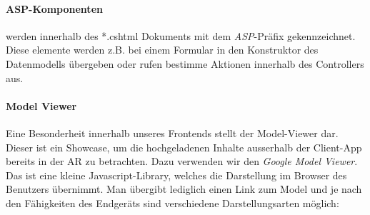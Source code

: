 \documentclass[titlepage, a4paper, 11pt]{scrartcl}
\begin{document}
        \paragraph{ASP-Komponenten} werden innerhalb des *.cshtml Dokuments mit dem \textit{ASP}-Präfix gekennzeichnet. Diese elemente werden z.B. bei einem Formular in den Konstruktor
        des Datenmodells übergeben oder rufen bestimme Aktionen innerhalb des Controllers aus.
        
        \paragraph{Model Viewer}

          Eine Besonderheit innerhalb unseres Frontends stellt der Model-Viewer dar. Dieser ist ein Showcase, um die hochgeladenen Inhalte ausserhalb der Client-App bereits in der AR zu betrachten.
          Dazu verwenden wir den \textit{Google Model Viewer}\cite{ModelViewer:online}. Das ist eine kleine Javascript-Library, welches die Darstellung im Browser des Benutzers übernimmt.
          Man übergibt lediglich einen Link zum Model und je nach den Fähigkeiten des Endgeräts sind verschiedene Darstellungsarten möglich:
\end{document}
